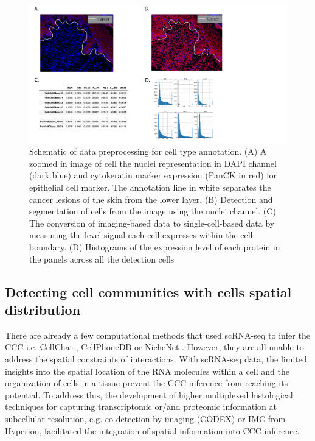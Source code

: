 \begin{figure}[htp]
    \centering
    \includegraphics[width=\columnwidth]{Chapter3/Figures/Cell_identification_skin_cancer-01.png}
    \caption{Schematic of data preprocessing for cell type annotation. (A) A zoomed in image of cell the nuclei representation in DAPI channel (dark blue) and cytokeratin marker expression (PanCK in red) for epithelial cell marker. The annotation line in white separates the cancer lesions of the skin from the lower layer. (B) Detection and segmentation of cells from the image using the nuclei channel. (C) The conversion of imaging-based data to single-cell-based data by measuring the level signal each cell expresses within the cell boundary. (D) Histograms of the expression level of each protein in the panels across all the detection cells}
    \label{fig:Polaris_skin_cancer_cell_iden}
\end{figure}

\subsection{Detecting cell communities with cells spatial distribution}
There are already a few computational methods that used scRNA-seq to infer the CCC i.e. CellChat \cite{jin2021CellChat}, CellPhoneDB \cite{efremova2020cellphonedb} or NicheNet \cite{browaeys2020nichenet}. However, they are all unable to address the spatial constraints of interactions. With scRNA-seq data, the limited insights into the spatial location of the RNA molecules within a cell and the organization of cells in a tissue prevent the CCC inference from reaching its potential. To address this, the development of higher multiplexed histological techniques for capturing transcriptomic or/and proteomic information at subcellular resolution, e.g. co-detection by imaging (CODEX) \cite{goltsev2018CODEX} or IMC from Hyperion, facilitated the integration of spatial information into CCC inference. 

